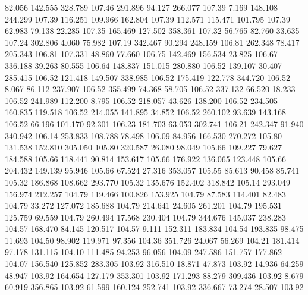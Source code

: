   82.056  142.555  328.789       107.46
 291.896   94.127  266.077       107.39
   7.169  148.108  244.299       107.39
 116.251  109.966  162.804       107.39
 112.571  115.471  101.795       107.39
  62.983   79.138   22.285       107.35
 165.469  127.502  358.361       107.32
  56.765   82.760   33.635       107.24
 302.806    4.060   75.982       107.19
 342.467   90.294  248.159       106.81
 262.348   78.417  205.343       106.81
 107.331   48.860   77.660       106.75
 142.469  156.534   23.825       106.67
 336.188   39.263   80.555       106.64
 148.837  151.015  280.880       106.52
 139.107   30.407  285.415       106.52
 121.418  149.507  338.985       106.52
 175.419  122.778  344.720       106.52
   8.067   86.112  237.907       106.52
 355.499   74.368   58.705       106.52
 337.132   66.520   18.233       106.52
 241.989  112.200    8.795       106.52
 218.057   43.626  138.200       106.52
 234.505  160.835  119.518       106.52
 214.055  141.895   34.852       106.52
 260.102   93.639  143.168       106.52
  66.196  101.170   92.301       106.23
 181.703   63.053  302.741       106.21
 242.347   91.940  340.942       106.14
 253.833  108.788   78.498       106.09
  84.956  166.530  270.272       105.80
 131.538  152.810  305.050       105.80
 320.587   26.080   98.049       105.66
 109.227   79.627  184.588       105.66
 118.441   90.814  153.617       105.66
 176.922  136.065  123.448       105.66
 204.432  149.139   95.946       105.66
  67.524   27.316  353.057       105.55
  85.613   90.458   85.741       105.32
 186.868  108.662  293.770       105.32
 135.676  152.402  318.842       105.14
 293.049  156.974  212.257       104.79
 119.466  100.826  153.925       104.79
  87.583  114.401   82.483       104.79
  33.272  127.072  185.688       104.79
 214.641   24.605  261.201       104.79
 195.531  125.759   69.559       104.79
 260.494   17.568  230.404       104.79
 344.676  145.037  238.283       104.57
 168.470   84.145  120.517       104.57
   9.111  152.311  183.834       104.54
 193.835   98.475   11.693       104.50
  98.902  119.971   97.356       104.36
 351.726   24.067   56.269       104.21
 181.414   97.178  131.115       104.10
 111.485   94.253   96.056       104.09
 247.586  151.757  177.862       104.07
 156.540  125.852  283.305       103.92
 316.510   18.871   47.873       103.92
  14.936   64.259   48.947       103.92
 164.654  127.179  353.301       103.92
 171.293   88.279  309.436       103.92
   8.679   60.919  356.865       103.92
  61.599  160.124  252.741       103.92
 336.667   73.274   28.507       103.92
